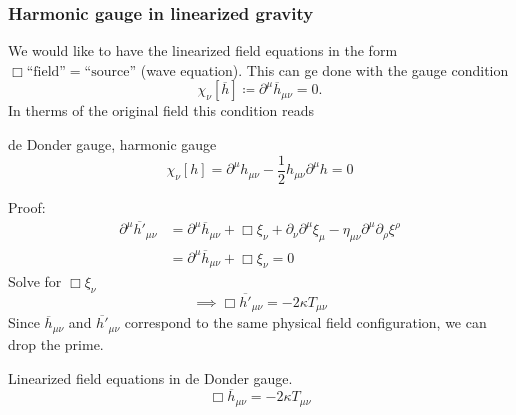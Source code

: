 \subsubsection{Harmonic gauge in linearized gravity}
We would like to have the linearized field equations in the form $\Box\text{``field''}=\text{``source''}$ (wave equation).
This can ge done with the gauge condition
\begin{equation}
    \chi_\nu \left[ \overline{h} \right] \coloneqq \partial^\mu \overline{h}_{\mu\nu} = 0.
\end{equation}
In therms of the original field this condition reads
\begin{definition}{de Donder gauge, harmonic gauge}
    \begin{equation}
        \chi_\nu \left[ h \right] = \partial^\mu h_{\mu\nu} - \frac{1}{2} h_{\mu\nu} \partial^\mu h = 0
    \end{equation}
\end{definition}
Proof:
\begin{equation}
    \begin{split}
        \partial^\mu \overline{h'}_{\mu\nu} &= \partial^\mu \overline{h}_{\mu\nu} + \Box \xi_\nu + \partial_\nu \partial^\mu \xi_\mu -
        \eta_{\mu\nu} \partial^\mu\partial_\rho\xi^\rho \\
        &= \partial^\mu \overline{h}_{\mu\nu} + \Box \xi_\nu = 0
    \end{split}
\end{equation}
Solve for $\Box\xi_\nu$
\begin{equation}
    \implies \Box \overline{h'}_{\mu\nu} = -2\kappa T_{\mu\nu}
\end{equation}
Since $\overline{h}_{\mu\nu}$ and $\overline{h'}_{\mu\nu}$ correspond to the same physical field configuration, we can drop the prime.
\begin{definition}{Linearized field equations in de Donder gauge.}
    \begin{equation}
    \Box \overline{h}_{\mu\nu} = - 2 \kappa T_{\mu\nu}
\end{equation}
\end{definition}